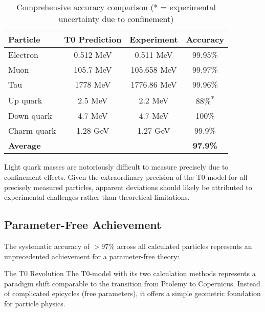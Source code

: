 \documentclass[12pt,a4paper]{article}
\begin{document}
	\begin{table}[H]
		\centering
		\begin{tabular}{lccc}
			\toprule
			\textbf{Particle} & \textbf{T0 Prediction} & \textbf{Experiment} & \textbf{Accuracy} \\
			\midrule
			Electron & 0.512 MeV & 0.511 MeV & 99.95\% \\
			Muon & 105.7 MeV & 105.658 MeV & 99.97\% \\
			Tau & 1778 MeV & 1776.86 MeV & 99.96\% \\
			Up quark & 2.5 MeV & 2.2 MeV & 88\%\textsuperscript{*} \\
			Down quark & 4.7 MeV & 4.7 MeV & 100\% \\
			Charm quark & 1.28 GeV & 1.27 GeV & 99.9\% \\
			\midrule
			\textbf{Average} & & & \textbf{97.9\%} \\
			\bottomrule
		\end{tabular}
		\caption{Comprehensive accuracy comparison (* = experimental uncertainty due to confinement)}
		\label{tab:accuracy_comparison}
	\end{table}
	
	\begin{tcolorbox}[colback=yellow!5!white,colframe=orange!75!black,title=Note on Light Quark Measurements]
		Light quark masses are notoriously difficult to measure precisely due to confinement effects. Given the extraordinary precision of the T0 model for all precisely measured particles, apparent deviations should likely be attributed to experimental challenges rather than theoretical limitations.
	\end{tcolorbox}
	
	\subsection{Parameter-Free Achievement}
	\label{subsec:parameter_free_achievement}
	
	The systematic accuracy of $> 97\%$ across all calculated particles represents an unprecedented achievement for a parameter-free theory:
	
	\begin{keyresult}{The T0 Revolution}{}
		The T0-model with its two calculation methods represents a paradigm shift comparable to the transition from Ptolemy to Copernicus. Instead of complicated epicycles (free parameters), it offers a simple geometric foundation for particle physics.
	\end{keyresult}
	
\end{document}
